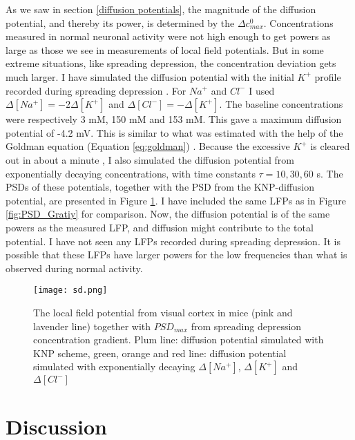 \documentclass{article}
\begin{document}
As we saw in section \ref{diffusion potentials}, the magnitude of the diffusion potential, and thereby its power, is determined by the $\Delta c_{max}^0$. Concentrations measured in normal neuronal activity were not high enough to get powers as large as those we see in measurements of local field potentials. But in some extreme situations, like spreading depression, the concentration deviation gets much larger. I have simulated the diffusion potential with the initial $K^+$ profile recorded during spreading depression \cite{Herreras1993}. For $Na^+$ and $Cl^-$ I used $\Delta [Na^+] = -2\Delta [K^+]$ and $\Delta [Cl^-] = -\Delta[K^+]$. The baseline concentrations were respectively 3 mM, 150 mM and 153 mM. This gave a maximum diffusion potential of -4.2 mV. This is similar to what was estimated with the help of the Goldman equation (Equation \ref{eq:goldman}) \cite{Herreras1993}. Because the excessive $K^+$ is cleared out in about a minute \cite{Ataya2015}, I also simulated the diffusion potential from exponentially decaying concentrations, with time constants $\tau = 10, 30, 60 $ s. The PSDs of these potentials, together with the PSD from the KNP-diffusion potential, are presented in Figure \ref{fig:sd}. I have included the same LFPs as in Figure \ref{fig:PSD_Gratiy} for comparison. 
Now, the diffusion potential is of the same powers as the measured  LFP, and diffusion might contribute to the total potential. I have not seen any LFPs recorded during spreading depression. It is possible that these LFPs have larger powers for the low frequencies than what is observed during normal activity. 

\begin{figure}
  \texttt{[image: sd.png]}
  \caption{The local field potential from visual cortex in mice (pink and lavender line) together with $PSD_{max}$ from spreading depression concentration gradient. Plum line: diffusion potential simulated with KNP scheme, green, orange and red line: diffusion potential simulated with exponentially decaying $\Delta [Na^+]$, $\Delta [K^+]$ and $\Delta [Cl^-]$}
  \label{fig:sd}
\end{figure}



\section{Discussion}
\end{document}
